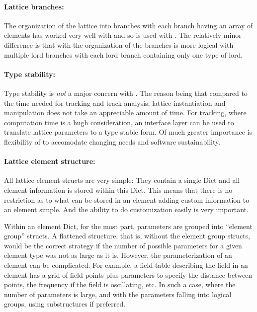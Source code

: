 \paragraph{Lattice branches:}
The organization of the lattice into branches with each branch having an array of elements has
worked very well with \bmad and so is used with \accellat. The relatively minor difference is
that with \accellat the organization of the branches is more logical with multiple lord branches
with each lord branch containing only one type of lord.

\paragraph{Type stability:}
Type stability is {\em not} a major concern with \accellat. The reason being that compared to
the time needed for tracking and track analysis, lattice instantiation
and manipulation does not take an appreciable amount of time. For tracking, where computation time
is a hugh consideration, an interface layer can be
used to translate lattice parameters to a type stable form. Of much greater importance is
flexibility of \accellat to accomodate changing needs and software sustainability.

\paragraph{Lattice element structure:}
All lattice element structs are very simple: They contain a single Dict and all element information
is stored within this Dict. This means that there is no restriction as to what can be stored
in an element adding custom information to an element simple. 
And the ability to do customization easily is very important. 

Within an element Dict, for the most part, parameters are grouped into ``element group'' structs. A flattened structure,
that is, without the element group structs, would be the correct strategy
if the number of possible parameters for a given element type was not as large as it is. 
However, the parameterization of an element can be complicated. 
For example, a field table describing the field in an element has a grid of field points plus 
parameters to specify the distance between points, the frequency if the field is oscillating, etc. 
In such a case, where the number of parameters is large, and with the parameters falling into 
logical groups, using substructures if preferred. 

